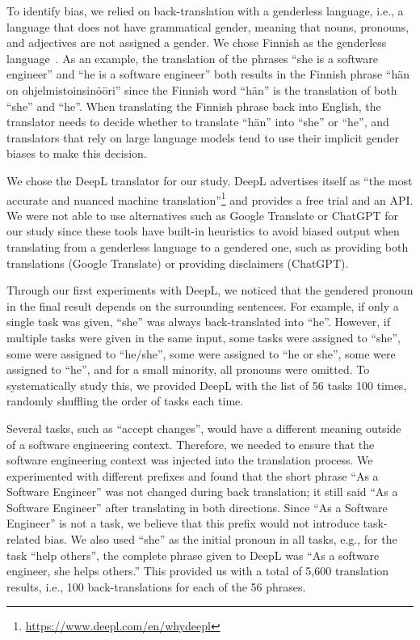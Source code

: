 \documentclass[10pt,conference]{IEEEtran}
\begin{document}
\begin{sloppy}
To identify bias, we relied on back-translation with a genderless language, i.e., a language that does not have grammatical gender, meaning that nouns, pronouns, and adjectives are not assigned a gender. We chose Finnish as the genderless language~\cite{renstrom2022gender}. As an example, the translation of the phrases ``she is a software engineer'' and ``he is a software engineer'' both results in the Finnish phrase ``hän on ohjelmistoinsinööri'' since the Finnish word ``hän'' is the translation of both ``she'' and ``he''. When translating the Finnish phrase back into English, the translator needs to decide whether to translate ``hän'' into ``she'' or ``he'', and translators that rely on large language models tend to use their implicit gender biases to make this decision.

We chose the DeepL translator for our study. DeepL advertises itself as ``the most accurate and nuanced machine translation''\footnote{\url{https://www.deepl.com/en/whydeepl}} and provides a free trial and an API. We were not able to use alternatives such as Google Translate or ChatGPT for our study since these tools have built-in heuristics to avoid biased output when translating from a genderless language to a gendered one, such as providing both translations (Google Translate) or providing disclaimers (ChatGPT).

Through our first experiments with DeepL, we noticed that the gendered pronoun in the final result depends on the surrounding sentences. For example, if only a single task was given, ``she'' was always back-translated into ``he''. However, if multiple tasks were given in the same input, some tasks were assigned to ``she'', some were assigned to ``he/she'', some were assigned to ``he or she'', some were assigned to ``he'', and for a small minority, all pronouns were omitted. To systematically study this, we provided DeepL with the list of 56 tasks 100 times, randomly shuffling the order of tasks each time.

Several tasks, such as ``accept changes'', would have a different meaning outside of a software engineering context. Therefore, we needed to ensure that the software engineering context was injected into the translation process. We experimented with different prefixes and found that the short phrase ``As a Software Engineer'' was not changed during back translation; it still said ``As a Software Engineer'' after translating in both directions. Since ``As a Software Engineer'' is not a task, we believe that this prefix would not introduce task-related bias. We also used ``she'' as the initial pronoun in all tasks, e.g., for the task ``help others'', the complete phrase given to DeepL was ``As a software engineer, she helps others.'' This provided us with a total of 5,600 translation results, i.e., 100 back-translations for each of the 56 phrases.


\end{sloppy}
\end{document}
